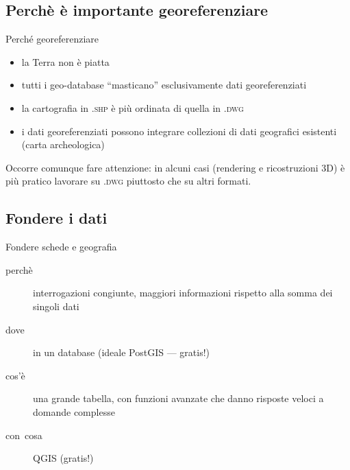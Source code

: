 \documentclass{beamer}
\begin{document}
            \subsection{Perchè è importante georeferenziare}

                \begin{frame}{Perché georeferenziare}
                    \begin{itemize}
                        \item la Terra non è piatta
                        \item tutti i geo-database ``masticano'' esclusivamente dati georeferenziati
                        \item la cartografia in \textsc{.shp} è più ordinata di quella in \textsc{.dwg}
                        \item i dati georeferenziati possono integrare collezioni di dati geografici esistenti (carta archeologica)
                    \end{itemize}
                    \vfill\pause
                    Occorre comunque fare attenzione: in alcuni casi (rendering e ricostruzioni 3D) è più pratico
                    lavorare su \textsc{.dwg} piuttosto che su altri formati.
                \end{frame}

            \subsection{Fondere i dati}

                \begin{frame}{Fondere schede e geografia}
                    \begin{description}
                        \item[perchè] interrogazioni congiunte, maggiori informazioni rispetto alla somma dei singoli dati
                        \item[dove] in un database (ideale PostGIS --- gratis!)
                        \item[cos'è] una grande tabella, con funzioni avanzate che danno risposte veloci a domande complesse
                        \item[con~cosa] QGIS (gratis!)
                    \end{description}
                \end{frame}
\end{document}
